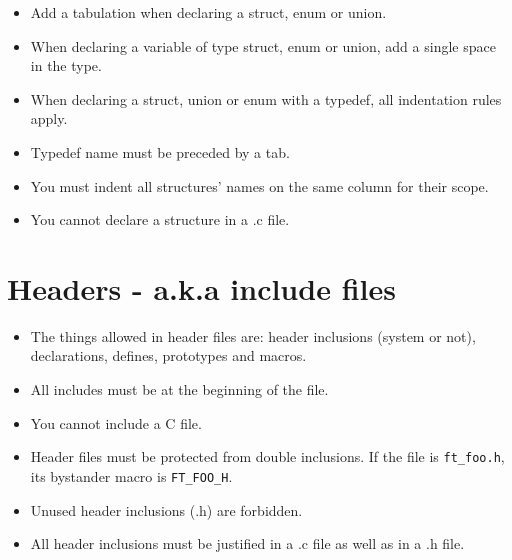 \documentclass{42-ko}
\begin{document}
        \begin{itemize}

            \item Add a tabulation when declaring a struct, enum or union.

            \item When declaring a variable of type struct, enum or union,
                add a single space in the type.

            \item When declaring a struct, union or enum with a typedef,
                all indentation rules apply.

            \item Typedef name must be preceded by a tab.

            \item You must indent all structures' names on the same column for their scope.

            \item You cannot declare a structure in a .c file.

        \end{itemize}
        \newpage


    \section{Headers - a.k.a include files}

        \begin{itemize}

            \item The things allowed in header files are:
                header inclusions (system or not), declarations, defines,
                prototypes and macros.

            \item All includes must be at the beginning of the file.

            \item You cannot include a C file.

            \item Header files must be protected from double inclusions. If the file is
            \texttt{ft\_foo.h}, its bystander macro is \texttt{FT\_FOO\_H}.

            \item Unused header inclusions (.h) are forbidden.

            \item All header inclusions must be justified in a .c file
                as well as in a .h file.

        \end{itemize}
\end{document}
